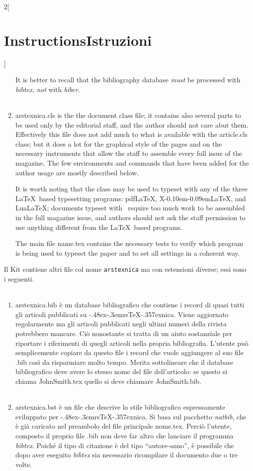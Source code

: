 \documentclass[12pt]{article}
\providecommand\pdfLaTeX{pdf\/\-\LaTeX}
\providecommand\XeLaTeX{X\kern-0.10em\raisebox{1.1ex}{\rotatebox{180}{E}}\kern-0.09em\-\LaTeX}
\providecommand\LuaLaTeX{Lua\-\LaTeX}
\DeclareRobustCommand*{\Ars}{\textsf{\lower -.48ex\hbox{\rotatebox{-20}{A}}\kern -.3em{rs}}\discretionary{-}{}{\kern -.05em}\TeX\discretionary{-}{}{\kern -.17em}\lower -.357ex\hbox{nica}}
\providecommand\file[1]{\textnormal{\ttfamily#1}}
\providecommand\pack[1]{\textnormal{\sffamily\slshape#1}}
\providecommand\prog[1]{\textnormal{\ttfamily\itshape#1}}
\providecommand\italian{\selectlanguage{italian}}
\begin{document}
\begin{paracol}{2}[\section{Instructions\hspace{5.6em}Istruzioni}]
\begin{enumerate}[noitemsep]
It is better to recall that the bibliography database \emph{must} be processed with \prog{bibtex}, \emph{not} with \prog{biber}.\\~
%
\item \file{arstexnica.cls} is the the document class file; it contains also several parts to be used only by the editorial staff, and the author should not care abut them. Effectively this file does not add much to what is available with the \file{article.cls} class; but it does a lot for the graphical style of the pages and on the necessary instruments that allow the staff to assemble every full issue of the magazine. The few environments and commands that have been added for the author usage are mostly described below.

It is worth noting that the class may be used to typeset with any of the three \LaTeX\ based typesetting programs: \pdfLaTeX, \XeLaTeX, and \LuaLaTeX; documents typeset with \ConTeXt\ require too much work to be assembled in the full magazine issue, and authors should not ask the staff permission to use anything different from the \LaTeX\ based programs.

The main file \file{name.tex} contains the necessary tests to verify which program is being used to typeset the paper and to set all settings in a coherent way.
%
\end{enumerate}

\switchcolumn{\section*{I file \file{arstexnica}}}\italian
Il Kit contiene altri file col nome \texttt{arstexnica} ma con estensioni diverse; essi sono i seguenti.\\~
\begin{enumerate}[noitemsep]
\item \file{arstexnica.bib} è un database bibliografico che contiene i record di quasi tutti gli articoli pubblicati su \Ars. Viene aggiornato regolarmente ma gli articoli pubblicati negli ultimi numeri della rivista potrebbero mancare. Ciò nonostante si tratta di un aiuto sostanziale per riportare i riferimenti di quegli articoli nella propria bibliografia. L'utente può semplicemente copiare da questo file i record che vuole aggiungere al suo file \file{.bib} così da risparmiare molto tempo.
Merita sottolineare che il database bibliografico deve avere lo stesso nome del file dell'articolo: se questo si chiama \file{JohnSmith.tex} quello si deve chiamare \file{JohnSmith.bib}.\\~
%
\item \file{arstexnica.bst} è un file che descrive lo stile bibliografico espressamente sviluppato per \Ars. Si basa sul pacchetto \pack{natbib}, che è già caricato nel preambolo del file principale \file{nome.tex}. Perciò l'utente, composto il proprio file \file{.bib} non deve far altro che lanciare il programma \prog{bibtex}. Poiché il tipo di citazione è del tipo “autore-anno”, è possibile che dopo aver eseguito \prog{bibtex} sia necessario ricompilare il documento due o tre volte.


\end{enumerate}
\end{paracol}
\end{document}
